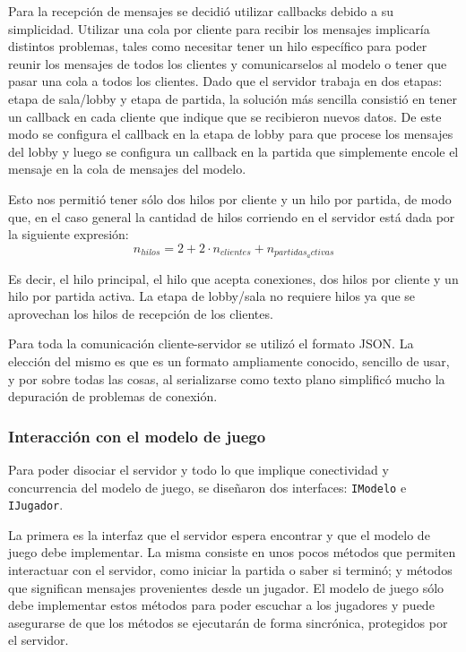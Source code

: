 \documentclass[titlepage,a4paper,12pt]{article}
\begin{document}
Para la recepción de mensajes se decidió utilizar callbacks debido a su simplicidad. Utilizar una cola por cliente para recibir los mensajes implicaría distintos problemas, tales como necesitar tener un hilo específico para poder reunir los mensajes de todos los clientes y comunicarselos al modelo o tener que pasar una cola a todos los clientes.  
Dado que el servidor trabaja en dos etapas: etapa de sala/lobby y etapa de partida, la solución más sencilla consistió en tener un callback en cada cliente que indique que se recibieron nuevos datos. De este modo se configura el callback en la etapa de lobby para que procese los mensajes del lobby y luego se configura un callback en la partida que simplemente encole el mensaje en la cola de mensajes 
del modelo.

Esto nos permitió tener sólo dos hilos por cliente y un hilo por partida, de modo que, en el caso general la cantidad de hilos corriendo en el servidor está dada por la siguiente expresión:
$$ n_{hilos} = 2 + 2 \cdot n_{clientes} + n_{partidas_activas}$$

Es decir, el hilo principal, el hilo que acepta conexiones, dos hilos por cliente y un hilo por partida activa.
La etapa de lobby/sala no requiere hilos ya que se aprovechan los hilos de recepción de los clientes.

Para toda la comunicación cliente-servidor se utilizó el formato JSON. La elección del mismo es que es un formato ampliamente conocido, sencillo de usar, y por sobre todas las cosas, al serializarse como texto plano simplificó mucho la depuración de problemas de conexión.

\subsubsection{Interacción con el modelo de juego}
Para poder disociar el servidor y todo lo que implique conectividad y concurrencia del modelo de juego, se diseñaron dos interfaces: \texttt{IModelo} e \texttt{IJugador}.

La primera es la interfaz que el servidor espera encontrar y que el modelo de juego debe implementar. La misma consiste en unos pocos métodos que permiten interactuar con el servidor, como iniciar la partida o saber si terminó; y métodos que significan mensajes provenientes desde un jugador. El modelo de juego sólo debe implementar estos métodos para poder escuchar a los jugadores y puede asegurarse de que los métodos se ejecutarán de forma sincrónica, protegidos por el servidor.
\end{document}
